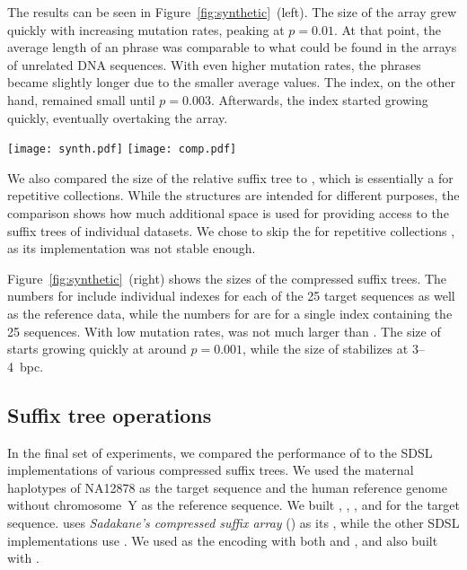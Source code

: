 The results can be seen in Figure~\ref{fig:synthetic}~(left). The size of the \RLCP{}
array grew quickly with increasing mutation rates, peaking at $p = 0.01$.
At that point, the average length of an \RLZ{} phrase was comparable to what
could be found in the \DLCP{} arrays of unrelated DNA sequences. With even
higher mutation rates, the phrases became slightly longer due to the smaller
average \LCP{} values. The \RFM{} index, on the other hand, remained small
until $p = 0.003$. Afterwards, the index started growing quickly, eventually
overtaking the \RLCP{} array.

\begin{figure*}
\begin{center}
\texttt{[image: synth.pdf]}%
\hspace{-0.6in}%
\texttt{[image: comp.pdf]}
\end{center}
\caption{Index size in bits per character vs.\ mutation rate for 25
synthetic sequences relative to a 20~MB reference.}\label{fig:synthetic}
\end{figure*}

We also compared the size of the relative suffix tree to \GCT{} \cite{Navarro2015},
which is essentially a \CSTsada{} for repetitive collections.
While the structures are intended for different purposes, the comparison shows how
much additional space is used for providing access to the suffix trees
of individual datasets. We chose to skip the \CSTnpr{} for repetitive collections
\cite{Abeliuk2013}, as its implementation was not stable enough.

Figure~\ref{fig:synthetic}~(right) shows the sizes of the compressed suffix
trees. The numbers for \RCST{} include individual indexes for each of the 25
target sequences as well as the reference data, while the numbers for \GCT{}
are for a single index containing the 25 sequences. With low mutation rates,
\RCST{} was not much larger than \GCT{}. The size of \RCST{} starts growing
quickly at around $p = 0.001$, while the size of \GCT{} stabilizes at
3\nobreakdash--4~bpc.

\subsection{Suffix tree operations}

In the final set of experiments, we compared the performance of \RCST{} to the
SDSL implementations of various compressed suffix trees. We used the maternal
haplotypes of NA12878 as the target sequence and the human reference genome
without chromosome~Y as the reference sequence. We built \RCST, \CSTsada,
\CSTnpr, and \FCST{} for the target sequence. \CSTsada{} uses \emph{Sadakane's
compressed suffix array} (\CSAsada) \cite{Sadakane2003} as its \CSA, while the
other SDSL implementations use \SSA. We used \PLCP{} as the \LCP{} encoding
with both \CSTsada{} and \CSTnpr{}, and also built \CSTnpr{} with \LCPdac.

